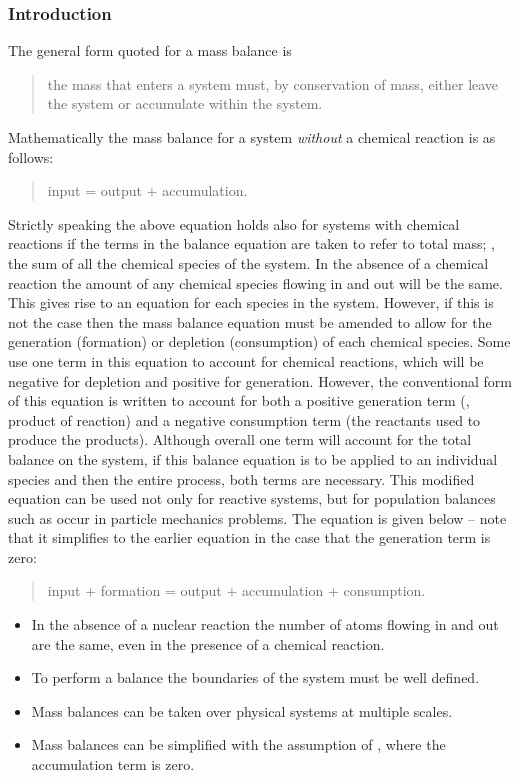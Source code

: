 \subsubsection{Introduction}
The general form quoted for a mass balance is 
\begin{quote}
the mass that enters a system must, by conservation of mass, either leave the system or accumulate within the system.
\end{quote}

Mathematically the mass balance for a system \emph{without} a chemical reaction is as follows:
\begin{quote}
input = output + accumulation.
\end{quote}

Strictly speaking the above equation holds also for systems with chemical reactions if the terms in the balance equation are taken to refer to total mass; \ie, the sum of all the chemical species of the system. In the absence of a chemical reaction the amount of any chemical species flowing in and out will be the same. This gives rise to an equation for each species in the system. However, if this is not the case then the mass balance equation must be amended to allow for the generation (formation) or depletion (consumption) of each chemical species. Some use one term in this equation to account for chemical reactions, which will be negative for depletion and positive for generation. However, the conventional form of this equation is written to account for both a positive generation term (\ie, product of reaction) and a negative consumption term (the reactants used to produce the products). Although overall one term will account for the total balance on the system, if this balance equation is to be applied to an individual species and then the entire process, both terms are necessary. This modified equation can be used not only for reactive systems, but for population balances such as occur in particle mechanics problems. The equation is given below -- note that it simplifies to the earlier equation in the case that the generation term is zero:
\begin{quote}
input + formation = output + accumulation + consumption.
\end{quote}
%
\begin{itemize}
\item In the absence of a nuclear reaction the number of atoms flowing in and out are the same, even in the presence of a chemical reaction.
%
\item To perform a balance the boundaries of the system must be well defined.
%
\item Mass balances can be taken over physical systems at multiple scales.
%
\item Mass balances can be simplified with the assumption of , where the accumulation term is zero.
\end{itemize}


